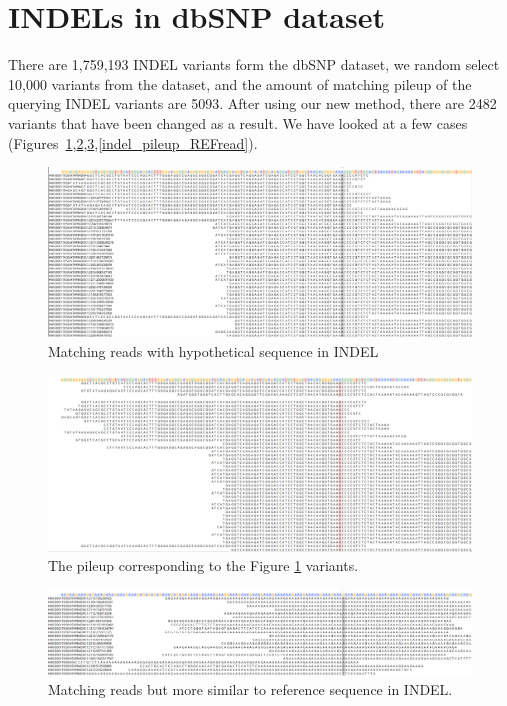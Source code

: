 \section{INDELs in dbSNP dataset}

There are 1,759,193 INDEL variants form the dbSNP dataset, we random select 10,000 variants from the dataset, and the amount of matching pileup of the querying INDEL variants are 5093. After using our new method, there are 2482 variants that have been changed as a result.  We have looked at a few cases (Figures~\ref{indel_new_ALTread},\ref{indel_pileup_ALTread},\ref{indel_new_REFread},\ref{indel_pileup_REFread}).

\begin{figure}[H]
\centering
\includegraphics[width=1\columnwidth]{body/image/indel_new_ALTread.png}
\caption[INDEL match reads]{Matching reads with hypothetical sequence in INDEL}
\label{indel_new_ALTread}
\end{figure}

\begin{figure}[H]
\centering
\includegraphics[width=1\columnwidth]{body/image/indel_pileup_ALTread.png}
\caption[Figure 4.22 pileup]{The pileup corresponding to the Figure \ref{indel_new_ALTread} variants.}
\label{indel_pileup_ALTread}
\end{figure}

\begin{figure}[H]
\centering
\includegraphics[width=1\columnwidth]{body/image/indel_new_REFread.png}
\caption[INDEL worse match reads]{Matching reads but more similar to reference sequence in INDEL.}
\label{indel_new_REFread}
\end{figure}

